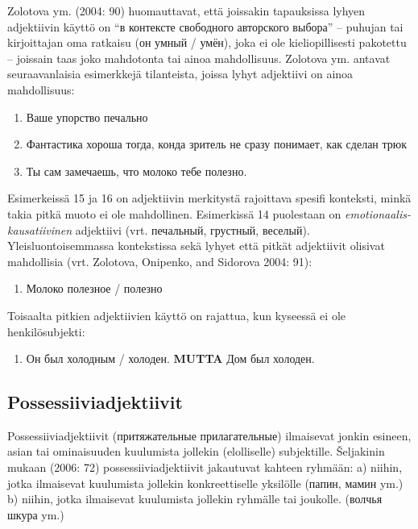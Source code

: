 \documentclass[]{scrreprt}
\providecommand{\tightlist}{%
  \setlength{\itemsep}{0pt}\setlength{\parskip}{0pt}}
\begin{document}
Zolotova ym. (2004: 90) huomauttavat, että joissakin tapauksissa lyhyen
adjektiivin käyttö on ``в контексте свободного авторского выбора'' --
puhujan tai kirjoittajan oma ratkaisu (он умный / умён), joka ei ole
kieliopillisesti pakotettu -- joissain taas joko mahdotonta tai ainoa
mahdollisuus. Zolotova ym. antavat seuraavanlaisia esimerkkejä
tilanteista, joissa lyhyt adjektiivi on ainoa mahdollisuus:

\begin{enumerate}
\def\labelenumi{(\arabic{enumi})}
\setcounter{enumi}{13}
\tightlist
\item
  Ваше упорство печально
\item
  Фантастика хороша тогда, конда зритель не сразу понимает, как сделан
  трюк
\item
  Ты сам замечаешь, что молоко тебе полезно.
\end{enumerate}

Esimerkeissä 15 ja 16 on adjektiivin merkitystä rajoittava spesifi
konteksti, minkä takia pitkä muoto ei ole mahdollinen. Esimerkissä 14
puolestaan on \emph{emotionaalis-kausatiivinen} adjektiivi (vrt.
печальный, грустный, веселый). Yleisluontoisemmassa kontekstissa sekä
lyhyet että pitkät adjektiivit olisivat mahdollisia (vrt. Zolotova,
Onipenko, and Sidorova 2004: 91):

\begin{enumerate}
\def\labelenumi{(\arabic{enumi})}
\setcounter{enumi}{16}
\tightlist
\item
  Молоко полезное / полезно
\end{enumerate}

Toisaalta pitkien adjektiivien käyttö on rajattua, kun kyseessä ei ole
henkilösubjekti:

\begin{enumerate}
\def\labelenumi{(\arabic{enumi})}
\setcounter{enumi}{17}
\tightlist
\item
  Он был холодным / холоден. \textbf{MUTTA} Дом был холоден.
\end{enumerate}

\subsection{Possessiiviadjektiivit}\label{possessiiviadjektiivit}

Possessiiviadjektiivit (притяжательные прилагательные) ilmaisevat jonkin
esineen, asian tai ominaisuuden kuulumista jollekin (elolliselle)
subjektille. Šeljakinin mukaan (2006: 72) possessiiviadjektiivit
jakautuvat kahteen ryhmään: a) niihin, jotka ilmaisevat kuulumista
jollekin konkreettiselle yksilölle (папин, мамин ym.) b) niihin, jotka
ilmaisevat kuulumista jollekin ryhmälle tai joukolle. (волчья шкура ym.)
\end{document}
